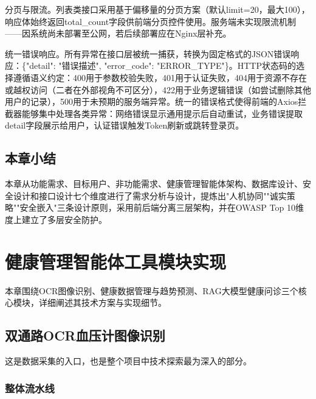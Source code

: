\documentclass[zihao=-4,a4paper]{ctexart}
\numberwithin{figure}{section}
\numberwithin{table}{section}
\begin{document}
分页与限流。列表类接口采用基于偏移量的分页方案（默认limit=20，最大100），响应体始终返回total\_count字段供前端分页控件使用。服务端未实现限流机制——因系统尚未部署至公网，若后续部署应在Nginx层补充。

统一错误响应。所有异常在接口层被统一捕获，转换为固定格式的JSON错误响应：\{"detail": "错误描述", "error\_code": "ERROR\_TYPE"\}。HTTP状态码的选择遵循语义约定：400用于参数校验失败，401用于认证失败，404用于资源不存在或越权访问（二者在外部视角不可区分），422用于业务逻辑错误（如尝试删除其他用户的记录），500用于未预期的服务端异常。统一的错误格式使得前端的Axios拦截器能够集中处理各类异常：网络错误显示通用提示后自动重试，业务错误提取detail字段展示给用户，认证错误触发Token刷新或跳转登录页。

\subsection{本章小结}

本章从功能需求、目标用户、非功能需求、健康管理智能体架构、数据库设计、安全设计和接口设计七个维度进行了需求分析与设计，提炼出"人机协同""诚实策略""安全嵌入"三条设计原则，采用前后端分离三层架构，并在OWASP Top 10维度上建立了多层安全防护。

\newpage
\section{健康管理智能体工具模块实现}

本章围绕OCR图像识别、健康数据管理与趋势预测、RAG大模型健康问诊三个核心模块，详细阐述其技术方案与实现细节。

\subsection{双通路OCR血压计图像识别}

这是数据采集的入口，也是整个项目中技术探索最为深入的部分。

\subsubsection{整体流水线}
\end{document}

